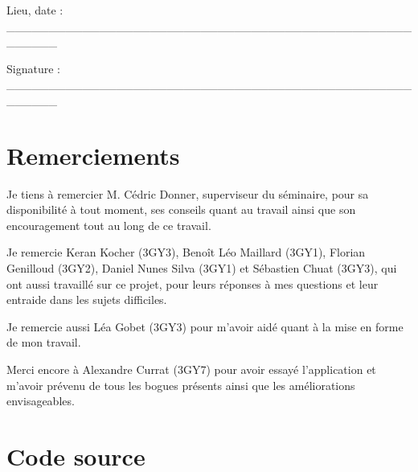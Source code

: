 \documentclass[a4paper,10pt,french]{sphinxmanual}
\begin{document}
Lieu, date : \_\_\_\_\_\_\_\_\_\_\_\_\_\_\_\_\_\_\_\_\_\_\_\_\_\_\_\_\_\_\_\_\_\_\_\_\_\_\_\_\_\_\_\_\_\_\_\_\_\_\_\_\_\_

Signature : \_\_\_\_\_\_\_\_\_\_\_\_\_\_\_\_\_\_\_\_\_\_\_\_\_\_\_\_\_\_\_\_\_\_\_\_\_\_\_\_\_\_\_\_\_\_\_\_\_\_\_\_\_\_


\section{Remerciements}
\label{annexes:remerciements}
Je tiens à remercier M. Cédric Donner, superviseur du séminaire, pour sa
disponibilité à tout moment, ses conseils quant au travail ainsi que son
encouragement tout au long de ce travail.

Je remercie Keran Kocher (3GY3), Benoît Léo Maillard (3GY1), Florian
Genilloud (3GY2), Daniel Nunes Silva (3GY1) et Sébastien Chuat (3GY3), qui ont
aussi travaillé sur ce projet, pour leurs réponses à mes questions et leur
entraide dans les sujets difficiles.

Je remercie aussi Léa Gobet (3GY3) pour m'avoir aidé quant à la mise en forme
de mon travail.

Merci encore à Alexandre Currat (3GY7) pour avoir essayé l'application et
m'avoir prévenu de tous les bogues présents ainsi que les améliorations
envisageables.


\section{Code source}
\label{annexes:code-source}
\end{document}
